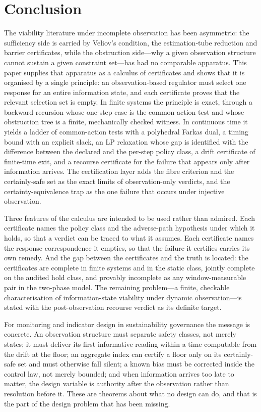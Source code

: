 \section{Conclusion}\label{sec:conclusion}

The viability literature under incomplete observation has been asymmetric: the sufficiency side is carried by Veliov's condition, the estimation-tube reduction and barrier certificates, while the obstruction side---why a given observation structure cannot sustain a given constraint set---has had no comparable apparatus. This paper supplies that apparatus as a calculus of certificates and shows that it is organised by a single principle: an observation-based regulator must select one response for an entire information state, and each certificate proves that the relevant selection set is empty. In finite systems the principle is exact, through a backward recursion whose one-step case is the common-action test and whose obstruction tree is a finite, mechanically checked witness. In continuous time it yields a ladder of common-action tests with a polyhedral Farkas dual, a timing bound with an explicit slack, an LP relaxation whose gap is identified with the difference between the declared and the per-step policy class, a drift certificate of finite-time exit, and a recourse certificate for the failure that appears only after information arrives. The certification layer adds the fibre criterion and the certainly-safe set as the exact limits of observation-only verdicts, and the certainty-equivalence trap as the one failure that occurs under injective observation.

Three features of the calculus are intended to be used rather than admired. Each certificate names the policy class and the adverse-path hypothesis under which it holds, so that a verdict can be traced to what it assumes. Each certificate names the response correspondence it empties, so that the failure it certifies carries its own remedy. And the gap between the certificates and the truth is located: the certificates are complete in finite systems and in the static class, jointly complete on the audited hold class, and provably incomplete as any window-measurable pair in the two-phase model. The remaining problem---a finite, checkable characterisation of information-state viability under dynamic observation---is stated with the post-observation recourse verdict as its definite target.

For monitoring and indicator design in sustainability governance the message is concrete. An observation structure must separate safety classes, not merely states; it must deliver its first informative reading within a time computable from the drift at the floor; an aggregate index can certify a floor only on its certainly-safe set and must otherwise fall silent; a known bias must be corrected inside the control law, not merely bounded; and when information arrives too late to matter, the design variable is authority after the observation rather than resolution before it. These are theorems about what no design can do, and that is the part of the design problem that has been missing.
